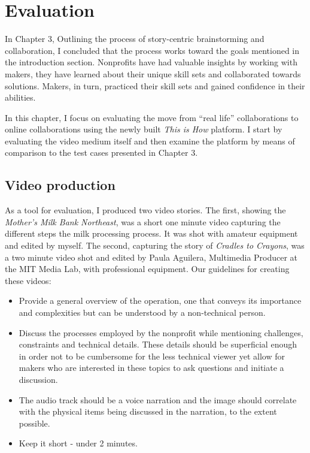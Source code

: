 \chapter{Evaluation}
\label{chap_eval}

In Chapter 3, Outlining the process of story-centric brainstorming and collaboration, I concluded that the process works toward the goals mentioned in the introduction section. Nonprofits have had valuable insights by working with makers, they have learned about their unique skill sets and collaborated towards solutions. Makers, in turn, practiced their skill sets and gained confidence in their abilities.

In this chapter, I focus on evaluating the move from ``real life'' collaborations to online collaborations using the newly built \textit{This is How} platform. I start by evaluating the video medium itself and then examine the platform by means of comparison to the test cases presented in Chapter 3.

\section{Video production} 
\label{video_production}

As a tool for evaluation, I produced two video stories. The first, showing the \textit{Mother's Milk Bank Northeast}, was a short one minute video capturing the different steps the milk processing process. It was shot with amateur equipment and edited by myself. The second, capturing the story of \textit{Cradles to Crayons}, was a two minute video shot and edited by Paula Aguilera, Multimedia Producer at the MIT Media Lab, with professional equipment. Our guidelines for creating these videos: 

\begin{itemize}
   \item Provide a general overview of the operation, one that conveys its importance and complexities but can be understood by a non-technical person.   
   \item Discuss the processes employed by the nonprofit while mentioning challenges, constraints and technical details. These details should be superficial enough in order not to be cumbersome for the less technical viewer yet allow for makers who are interested in these topics to ask questions and initiate a discussion.
   \item The audio track should be a voice narration and the image should correlate with the physical items being discussed in the narration, to the extent possible. 
   \item Keep it short - under 2 minutes. 
\end{itemize}

